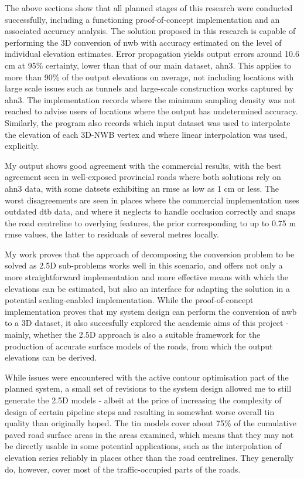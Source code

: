 The above sections show that all planned stages of this research were conducted successfully, including a functioning proof-of-concept implementation and an associated accuracy analysis. The solution proposed in this research is capable of performing the 3D conversion of \ac{nwb} with accuracy estimated on the level of individual elevation estimates. Error propagation yields output errors around 10.6 cm at 95\% certainty, lower than that of our main dataset, \ac{ahn3}. This applies to more than 90\% of the output elevations on average, not including locations with large scale issues such as tunnels and large-scale construction works captured by \ac{ahn3}. The implementation records where the minimum sampling density was not reached to advise users of locations where the output has undetermined accuracy. Similarly, the program also records which input dataset was used to interpolate the elevation of each 3D-NWB vertex and where linear interpolation was used, explicitly.

My output shows good agreement with the commercial results, with the best agreement seen in well-exposed provincial roads where both solutions rely on \ac{ahn3} data, with some datsets exhibiting an \ac{rmse} as low as 1 cm or less. The worst disagreements are seen in places where the commercial implementation uses outdated \ac{dtb} data, and where it neglects to handle occlusion correctly and snaps the road centreline to overlying features, the prior corresponding to up to 0.75 m \ac{rmse} values, the latter to residuals of several metres locally.

My work proves that the approach of decomposing the conversion problem to be solved as 2.5D sub-problems works well in this scenario, and offers not only a more straightforward implementation and more effective means with which the elevations can be estimated, but also an interface for adapting the solution in a potential scaling-enabled implementation. While the proof-of-concept implementation proves that my system design can perform the conversion of \ac{nwb} to a 3D dataset, it also succesfully explored the academic aims of this project - mainly, whether the 2.5D approach is also a suitable framework for the production of accurate surface models of the roads, from which the output elevations can be derived.

While issues were encountered with the active contour optimisation part of the planned system, a small set of revisions to the system design allowed me to still generate the 2.5D models - albeit at the price of increasing the complexity of design of certain pipeline steps and resulting in somewhat worse overall \ac{tin} quality than originally hoped. The \ac{tin} models cover about 75\% of the cumulative paved road surface areas in the areas examined, which means that they may not be directly usable in some potential applications, such as the interpolation of elevation series reliably in places other than the road centrelines. They generally do, however, cover most of the traffic-occupied parts of the roads.

